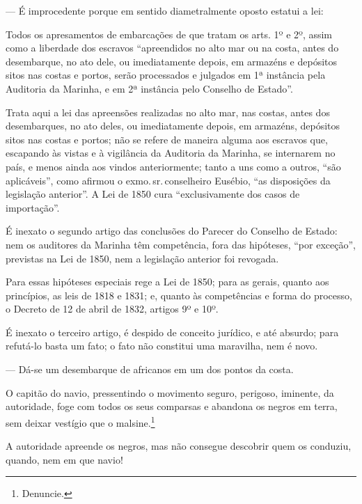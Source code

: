 --- É improcedente porque em sentido diametralmente oposto estatui a
lei:

Todos os apresamentos de embarcações de que tratam os arts. 1º e 2º,
assim como a liberdade dos escravos ``apreendidos no alto mar ou na
costa, antes do desembarque, no ato dele, ou imediatamente depois, em
armazéns e depósitos sitos nas costas e portos, serão processados e
julgados em 1ª instância pela Auditoria da Marinha, e em 2ª
instância pelo Conselho de Estado''.

Trata aqui a lei das apreensões realizadas no alto mar, nas costas,
antes dos desembarques, no ato deles, ou imediatamente depois, em
armazéns, depósitos sitos nas costas e portos; não se refere de maneira
alguma aos escravos que, escapando às vistas e à vigilância da Auditoria
da Marinha, se internarem no país, e menos ainda aos vindos
anteriormente; tanto a uns como a outros, ``são aplicáveis'', como afirmou
o exmo.\,sr.\,conselheiro Eusébio, ``as disposições da legislação
anterior''. A Lei de 1850 cura ``exclusivamente dos casos de importação''.

É inexato o segundo artigo das conclusões do Parecer do Conselho de
Estado: nem os auditores da Marinha têm competência, fora das hipóteses,
``por exceção'', previstas na Lei de 1850, nem a legislação anterior foi
revogada.

Para essas hipóteses especiais rege a Lei de 1850; para as gerais,
quanto aos princípios, as leis de 1818 e 1831; e, quanto às competências
e forma do processo, o Decreto de 12 de abril de 1832, artigos 9º
e 10º.

É inexato o terceiro artigo, é despido de conceito jurídico, e até
absurdo; para refutá-lo basta um fato; o fato não constitui uma
maravilha, nem é novo.

--- Dá-se um desembarque de africanos em um dos pontos da costa.

O capitão do navio, pressentindo o movimento seguro, perigoso, iminente,
da autoridade, foge com todos os seus comparsas e abandona os negros em
terra, sem deixar vestígio que o malsine.\footnote{Denuncie.}

A autoridade apreende os negros, mas não consegue descobrir quem os
conduziu, quando, nem em que navio!

